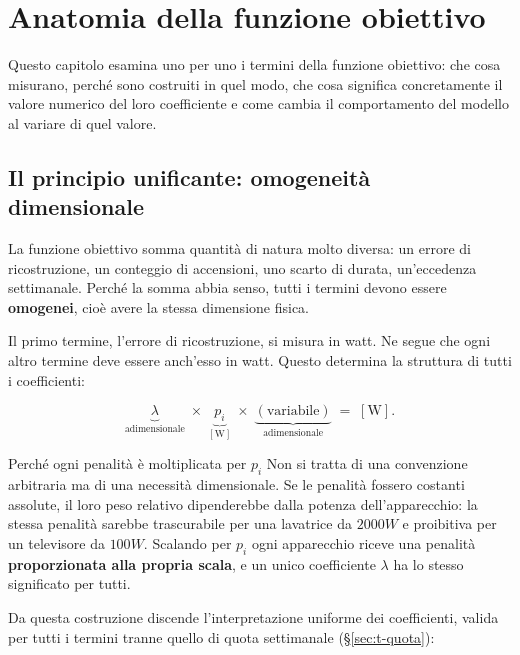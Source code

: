 \chapter{Anatomia della funzione obiettivo}
\label{ch:obiettivo}

Questo capitolo esamina uno per uno i termini della funzione obiettivo: che cosa misurano, perché
sono costruiti in quel modo, che cosa significa concretamente il valore numerico del loro
coefficiente e come cambia il comportamento del modello al variare di quel valore.

\section{Il principio unificante: omogeneità dimensionale}
\label{sec:omogeneita}

La funzione obiettivo somma quantità di natura molto diversa: un errore di ricostruzione, un
conteggio di accensioni, uno scarto di durata, un'eccedenza settimanale. Perché la somma abbia
senso, tutti i termini devono essere \textbf{omogenei}, cioè avere la stessa dimensione fisica.

Il primo termine, l'errore di ricostruzione, si misura in watt. Ne segue che ogni altro termine
deve essere anch'esso in watt. Questo determina la struttura di tutti i coefficienti:

\begin{equation}
  \underbrace{\lambda}_{\text{adimensionale}}
  \;\times\;
  \underbrace{p_i}_{[\mathrm{W}]}
  \;\times\;
  \underbrace{(\text{variabile})}_{\text{adimensionale}}
  \;=\;
  [\mathrm{W}] .
\end{equation}

\begin{notebox}{Perché ogni penalità è moltiplicata per $p_i$}
Non si tratta di una convenzione arbitraria ma di una necessità dimensionale. Se le penalità
fossero costanti assolute, il loro peso relativo dipenderebbe dalla potenza dell'apparecchio: la
stessa penalità sarebbe trascurabile per una lavatrice da $2000\unit{W}$ e proibitiva per un
televisore da $100\unit{W}$. Scalando per $p_i$ ogni apparecchio riceve una penalità
\textbf{proporzionata alla propria scala}, e un unico coefficiente $\lambda$ ha lo stesso
significato per tutti.
\end{notebox}

Da questa costruzione discende l'interpretazione uniforme dei coefficienti, valida per tutti i
termini tranne quello di quota settimanale (§\ref{sec:t-quota}):

